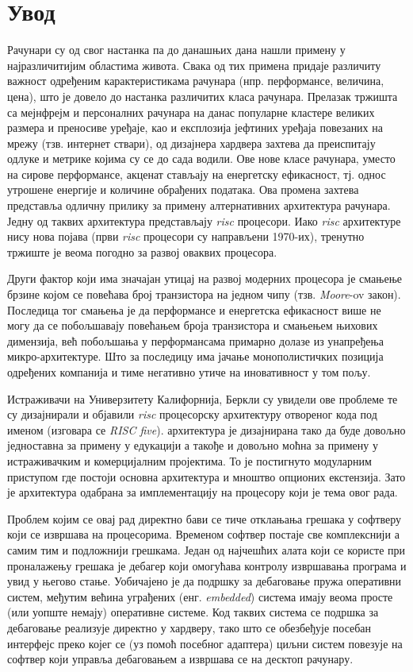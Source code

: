 \chapter{Увод}

Рачунари су од свог настанка па до данашњих дана нашли примену у најразличитијим областима живота.
Свака од тих примена придаје различиту важност одређеним карактеристикама рачунара (нпр. перформансе, величина, цена),
што је довело до настанка различитих класа рачунара. Прелазак тржишта са мејнфрејм и персоналних рачунара на данас популарне кластере великих размера и преносиве уређаје, као и експлозија јефтиних уређаја повезаних на мрежу (тзв. интернет ствари), од дизајнера хардвера захтева да преиспитају одлуке и метрике којима су се до сада водили.
Ове нове класе рачунара, уместо на сирове перформансе, акценат стављају на енергетску ефикасност, тј. однос утрошене енергије и количине обрађених података.
Ова промена захтева представља одличну прилику за примену алтернативних архитектура рачунара. Једну од таквих архитектура представљају \textit{\acrfull{risc}} процесори. Иако \textit{\acrshort{risc}} архитектуре нису нова појава (први \textit{\acrshort{risc}} процесори су направљени 1970-их), тренутно тржиште је веома погодно за развој оваквих процесора.

Други фактор који има значајан утицај на развој модерних процесора је смањење брзине којом се повећава број транзистора на једном чипу (тзв. \textit{Moore}-ov закон).
Последица тог смањења је да перформансе и енергетска ефикасност више не могу да се побољшавају повећањем броја транзистора и смањењем њихових димензија, већ побољшања у перформансама примарно долазе из унапређења микро-архитектуре. Што за последицу има јачање монополистичких позиција одређених компанија и тиме негативно утиче на иновативност у том пољу.

Истраживачи на Универзитету Калифорнија, Беркли су увидели ове проблеме те су дизајнирали и објавили \textit{\acrshort{risc}} процесорску архитектуру отвореног кода под именом \cite{riscv} (изговара се \textit{RISC five}).  архитектура је дизајнирана тако да буде довољно једноставна за примену у едукацији а такође и довољно моћна за примену у истраживачким\cite{rocket} и комерцијалним\cite{sifive}\cite{tenstorrent} пројектима. То је постигнуто модуларним приступом где постоји основна архитектура и мноштво опционих екстензија. Зато је  архитектура одабрана за имплементацију на процесору који је тема овог рада.

Проблем којим се овај рад директно бави се тиче отклањања грешака у софтверу који се извршава на  процесорима.
Временом софтвер постаје све комплекснији а самим тим и подложнији грешкама. 
Један од најчешћих алата који се користе при проналажењу грешака је дебагер који омогућава контролу извршавања програма и увид у његово стање.
Уобичајено је да подршку за дебаговање пружа оперативни систем, међутим већина уграђених (енг. \textit{embedded}) система имају веома просте (или уопште немају) оперативне системе.
Код таквих система се подршка за дебаговање реализује директно у хардверу, тако што се обезбеђује посебан интерфејс преко којег се (уз помоћ посебног адаптера) циљни систем повезује на софтвер који управља дебаговањем а извршава се на десктоп рачунару.

